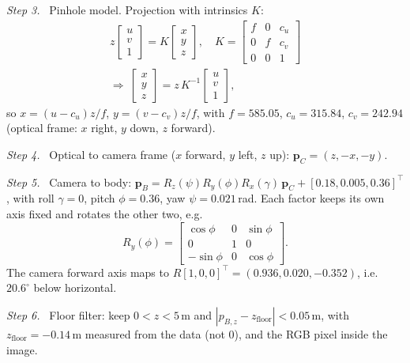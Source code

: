 \documentclass[letterpaper, 10pt, conference]{ieeeconf}
\newcommand{\p}{\mathbf{p}}
\newcommand{\step}[1]{\par\noindent\textit{Step #1.}\ }
\begin{document}
\step{3} Pinhole model. Projection with intrinsics $K$:
\begin{equation}
\begin{gathered}
z\begin{bmatrix}u\\v\\1\end{bmatrix}=K\begin{bmatrix}x\\y\\z\end{bmatrix},\quad
K=\begin{bmatrix}f&0&c_u\\0&f&c_v\\0&0&1\end{bmatrix}\\
\Rightarrow\
\begin{bmatrix}x\\y\\z\end{bmatrix}=z\,K^{-1}\begin{bmatrix}u\\v\\1\end{bmatrix},
\end{gathered}
\end{equation}
so $x=(u-c_u)z/f$, $y=(v-c_v)z/f$, with $f=585.05$, $c_u=315.84$,
$c_v=242.94$ (optical frame: $x$ right, $y$ down, $z$ forward).

\step{4} Optical to camera frame ($x$ forward, $y$ left, $z$ up):
$\p_C=(z,-x,-y)$.

\step{5} Camera to body: $\p_B=R_z(\psi)R_y(\phi)R_x(\gamma)\,\p_C+[0.18,0.005,0.36]^\top$,
with roll $\gamma=0$, pitch $\phi=0.36$, yaw $\psi=0.021$\,rad. Each factor keeps its own axis
fixed and rotates the other two, e.g.
\begin{equation}
R_y(\phi)=\begin{bmatrix}\cos\phi&0&\sin\phi\\0&1&0\\-\sin\phi&0&\cos\phi\end{bmatrix}.
\end{equation}
The camera forward axis maps to $R[1,0,0]^\top=(0.936,0.020,-0.352)$, i.e.\
$20.6^\circ$ below horizontal.

\step{6} Floor filter: keep $0<z<5$\,m and $|p_{B,z}-z_{\text{floor}}|<0.05$\,m,
with $z_{\text{floor}}=-0.14$\,m measured from the data (not 0), and the RGB pixel inside the image.
\end{document}
